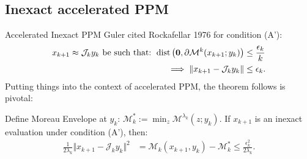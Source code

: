 \documentclass[11pt]{beamer}
\begin{document}
    \subsection{Inexact accelerated PPM}
        \begin{frame}{Accelerated Inexact PPM}
            Guler cited Rockafellar 1976 \cite{rockafellar_monotone_1976} for condition (A'): 
            \begin{align*}
                x_{k + 1}\approx \mathcal J_{k} y_k \text{ be such that: }
                \operatorname{dist}\left(
                    \mathbf 0, \partial \mathcal M^{k}(x_{k + 1}; y_k)
                \right) &\le \frac{\epsilon_k}{k}
                \\
                \implies 
                \Vert x_{k + 1} - \mathcal J_{k}y_k\Vert 
                &\le \epsilon_k. 
            \end{align*}
            Putting things into the context of accelerated PPM, the theorem follows is pivotal: 
            \begin{theorem}
                Define Moreau Envelope at $y_k$: $\mathcal M_k^* := \min_z \mathcal {M}^{\lambda_k}(z; y_k)$. 
                If $x_{k +1}$ is an inexact evaluation under condition (A'), then: 
                \begin{align*}
                    \frac{1}{2\lambda_k} \Vert x_{k + 1} - \mathcal J_k y_k\Vert^2
                    &= 
                    \mathcal M_k(x_{k + 1}, y_k) - \mathcal M^*_k
                    \le \frac{\epsilon_k^2}{2\lambda_k}. 
                \end{align*}
            \end{theorem}
        \end{frame}
\end{document}
